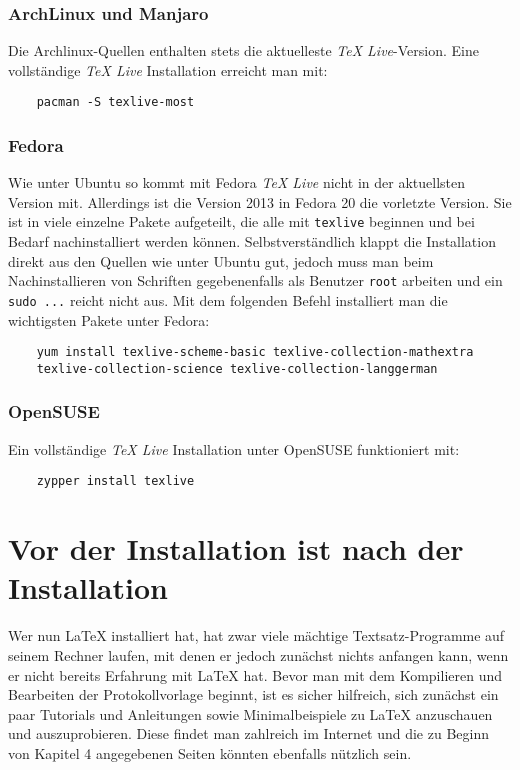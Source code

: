 \subsubsection{ArchLinux und Manjaro}
Die Archlinux-Quellen enthalten stets die aktuelleste \textit{TeX Live}-Version. 
Eine vollständige \textit{TeX Live} Installation erreicht man mit:
\begin{verbatim}
	pacman -S texlive-most
\end{verbatim}

\subsubsection{Fedora}
Wie unter Ubuntu so kommt mit Fedora \textit{TeX Live} nicht in der aktuellsten 
Version mit. Allerdings ist die Version 2013 in Fedora 20 die vorletzte 
Version. Sie ist in viele einzelne Pakete aufgeteilt, die alle mit 
\verb|texlive| beginnen und bei Bedarf nachinstalliert werden 
können. Selbstverständlich klappt die Installation direkt aus den Quellen wie 
unter Ubuntu gut, jedoch muss man beim Nachinstallieren von Schriften 
gegebenenfalls als Benutzer \verb|root| arbeiten und ein \verb|sudo ...| 
reicht nicht aus. Mit dem folgenden Befehl installiert man die wichtigsten 
Pakete unter Fedora:
\begin{verbatim}
	yum install texlive-scheme-basic texlive-collection-mathextra
	texlive-collection-science texlive-collection-langgerman 
\end{verbatim}

\subsubsection{OpenSUSE}
Ein vollständige \textit{TeX Live} Installation unter OpenSUSE funktioniert mit:
\begin{verbatim}
	zypper install texlive
\end{verbatim}

\section{Vor der Installation ist nach der Installation}
Wer nun LaTeX installiert hat, hat zwar viele mächtige Textsatz-Programme auf 
seinem Rechner laufen, mit denen er jedoch zunächst nichts anfangen kann, wenn 
er nicht bereits Erfahrung mit LaTeX hat. Bevor man mit dem Kompilieren und 
Bearbeiten der Protokollvorlage beginnt, ist es sicher hilfreich, sich zunächst 
ein paar Tutorials und Anleitungen sowie Minimalbeispiele zu LaTeX anzuschauen 
und auszuprobieren. Diese findet man zahlreich im Internet und die zu Beginn von 
Kapitel 4 angegebenen Seiten könnten ebenfalls nützlich sein.

